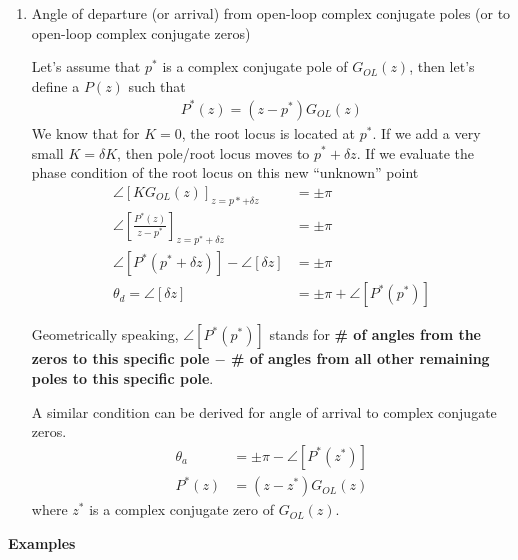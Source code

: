 \documentclass[twoside]{article}
\begin{document}
\begin{enumerate}
\item Angle of departure (or arrival) from open-loop complex 
conjugate poles (or to open-loop complex conjugate zeros)

Let's assume that $p^*$ is a complex conjugate pole of $G_{OL}(z)$, then let's define a
$P(z)$ such that
%
\begin{align*}
  P^*(z) = (z - p^*) G_{OL}(z)
\end{align*}
%
We know that for $K = 0$, the root locus is located at $p^*$. If we
add a very small $K = \delta K$, then pole/root locus moves to $p^* +
\delta z$. If we evaluate the phase condition of the root locus on
this new ``unknown'' point
%
\begin{align*}
\angle [ K G_{OL}(z) ]_{z = p*+\delta z} &= \pm \pi 
\\
\angle \left[  \frac{P^*(z)}{z - p^*} \right]_{z = p^* + \delta z} &=
                                                                    \pm
                                                                     \pi
\\
\angle \left[  P^*(p^* + \delta z) \right]
-
\angle \left[ \delta z \right] &= \pm \pi
\\
\theta_{d} = \angle \left[ \delta z \right] &= \pm \pi + \angle \left[  P^*(p^*) \right]
\end{align*}

Geometrically speaking, $\angle \left[  P^*(p^*) \right]$ stands for
\textbf{\# of angles from the zeros to this specific pole
  $-$ \# of angles from all other remaining poles to this specific pole}.

A similar condition can be derived for angle of arrival to complex
conjugate zeros.
%
\begin{align*}
\theta_{a} &= \pm \pi - \angle \left[  P^*(z^*) \right]
\\
P^*(z) &= (z - z^*) G_{OL}(z)
\end{align*}
%
where $z^*$ is a complex conjugate zero of $G_{OL}(z)$.

\end{enumerate}

\newpage

\textbf{Examples}
\end{document}
